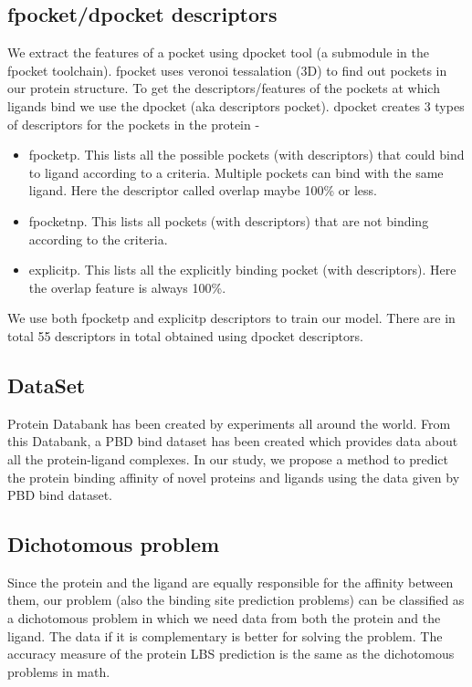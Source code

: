 \documentclass[11pt]{article}
\begin{document}
\subsection{fpocket/dpocket descriptors}
We extract the features of a pocket using dpocket tool (a submodule in the fpocket toolchain).
fpocket uses veronoi tessalation (3D) to find out pockets in our protein structure.
To get the descriptors/features of the pockets at which ligands bind we use the dpocket (aka descriptors pocket).
dpocket creates 3 types of descriptors for the pockets in the protein -
\begin{itemize}
\item fpocketp.  This lists all the possible pockets (with descriptors) that could bind to ligand according to a criteria.
Multiple pockets can bind with the same ligand.
Here the descriptor called overlap maybe 100\% or less.
\item fpocketnp.  This lists all pockets (with descriptors) that are not binding according to the criteria.
\item explicitp.
This lists all the explicitly binding pocket (with descriptors).
Here the overlap feature is always 100\%.
\end{itemize}

We use both fpocketp and explicitp descriptors to train our model.
There are in total 55 descriptors in total obtained using dpocket descriptors.

\subsection{DataSet}
Protein Databank has been created by experiments all around the world.
From this Databank, a PBD bind dataset has been created which provides data about all the protein-ligand complexes.
In our study, we propose a method to predict the protein binding affinity of novel proteins and ligands using the data given by PBD bind dataset.

\subsection{Dichotomous problem}
Since the protein and the ligand are equally responsible for the affinity between them, our problem (also the binding site prediction problems) can be classified as a dichotomous problem in which we need data from both
the protein and the ligand.
The data if it is complementary is better for solving the problem.
The accuracy measure of the protein LBS prediction is the same as the dichotomous problems in math.
\end{document}
